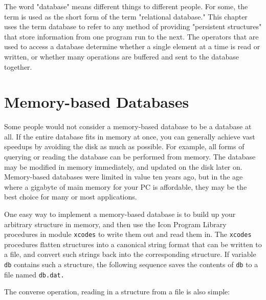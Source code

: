The word "database" means different things
to different people. For some, the term is used as the short form of
the term "relational database." This
chapter uses the term database to refer to any method of providing
"persistent structures" that store
information from one program run to the next. The operators that are
used to access a database determine whether a single element at a time
is read or written, or whether many operations are buffered and sent to
the database together.

\section{Memory-based Databases}

Some people would not consider a memory-based
database to be a database at all. If the
entire database fits in memory at once, you can generally achieve vast
speedups by avoiding the disk as much as possible. For example, all
forms of querying or reading the database can be performed from memory.
The database may be modified in memory immediately, and updated on the
disk later on. Memory-based databases were limited in value ten years
ago, but in the age where a gigabyte of main memory for your PC is
affordable, they may be the best choice for many or most applications.

One easy way to implement a memory-based database is to build up your
arbitrary structure in memory, and then use the Icon Program Library
procedures in module \texttt{xcodes} to write them out and read them
in. The \texttt{xcodes} procedures flatten structures
into a canonical string format that can be written to a file, and
convert such strings back into the corresponding structure. If variable
\texttt{db} contains such a structure, the following sequence saves the
contents of \texttt{db} to a file named \texttt{db.dat.}


\noindent
The converse operation, reading in a structure from a file is also
simple:


